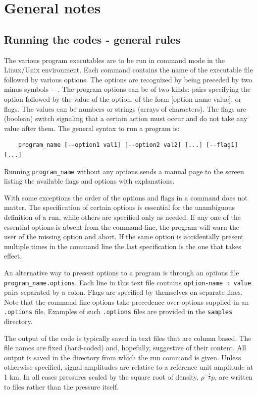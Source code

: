 
\section{General notes}

\subsection{Running the codes - general rules}
The various program executables are to be run in command mode in the Linux/Unix environment. Each command contains the name of the executable file followed by various options. The options are recognized by being preceded by two minus symbols \verb"--". The program options can be of two kinds: pairs specifying the option followed by the value of the option, of the form [option-name  value], or flags. The values can be numbers or strings (arrays of characters). The flags are (boolean) switch signaling that a certain action must occur and do not take any value after them. The general syntax to run a program is:
\begin{verbatim} 
    program_name [--option1 val1] [--option2 val2] [...] [--flag1] [...] 
\end{verbatim}
Running \verb"program_name" without any options sends a manual page to the screen listing the available flags and options with explanations. 

With some exceptions the order of the options and flags in a command does not matter. The specification of certain options is essential for the unambiguous definition of a run, while others are specified only as needed. If any one of the essential options is absent from the command line, the program will warn the user of the missing option and abort.  If the same option is accidentally present multiple times in the command line the last specification is the one that takes effect. 

An alternative way to present options to a program is through an options file \verb"program_name.options".  Each line in this text file contains \verb"option-name : value" pairs separated by a colon. Flags are specified by themselves on separate lines. Note that the command line options take precedence over options supplied  in an \verb".options" file. Examples of such \verb".options" files are provided in the \verb"samples" directory.

The output of the code is typically saved in text files that are column based. The file names are fixed (hard-coded) and, hopefully, suggestive of their content. All output is saved in the directory from which the run command is given. Unless otherwise specified, signal amplitudes are relative to a reference unit amplitude at 1 km. In all cases pressures scaled by the square root of density, $\rho^{-\frac{1}{2}}p$, are written to files rather than the pressure itself. 

